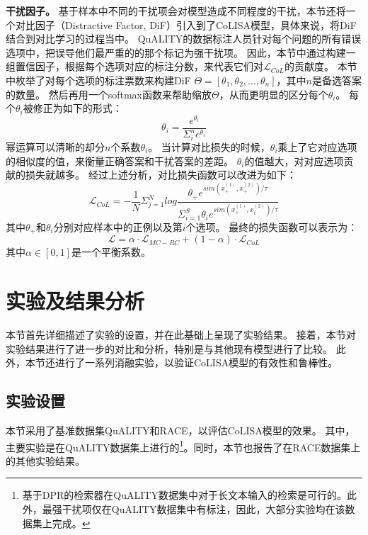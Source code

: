 \textbf{干扰因子。}
基于样本中不同的干扰项会对模型造成不同程度的干扰，本节还将一个对比因子（Distractive Factor, DiF）引入到了CoLISA模型，具体来说，将DiF结合到对比学习的过程当中。
QuALITY的数据标注人员针对每个问题的所有错误选项中，把误导他们最严重的的那个标记为强干扰项。
因此，本节中通过构建一组置信因子，根据每个选项对应的标注分数，来代表它们对$\mathcal L_{CoL}$的贡献度。
本节中枚举了对每个选项的标注票数来构建DiF $\Theta=[\theta_1, \theta_2, ..., \theta_n]$，其中$n$是备选答案的数量。
然后再用一个softmax函数来帮助缩放$\Theta$，从而更明显的区分每个$\theta_i$。
每个$\theta_i$被修正为如下的形式：
\begin{equation}
    \theta_i=\frac{e^{\theta_i}}{\Sigma^n_i e^{\theta_i}}
\end{equation}
幂运算可以清晰的却分$n$个系数$\theta_i$。
当计算对比损失的时候，$\theta_i$乘上了它对应选项的相似度的值，来衡量正确答案和干扰答案的差距。
$\theta_i$的值越大，对对应选项贡献的损失就越多。
经过上述分析，对比损失函数可以改进为如下：
\begin{equation}
    \mathcal L_{CoL}=-\frac{1}{N}\Sigma^N_{j=1}log \frac{\theta_+e^{sim(x^{(1)}_+,x^{(2)}_+)/ \tau}}{\Sigma^S_{i=1} \theta_ie^{sim(x^{(1)}_+,x^{(2)}_i)/ \tau}}
\end{equation}
其中$\theta_+$和$\theta_i$分别对应样本中的正例以及第$i$个选项。
最终的损失函数可以表示为：
\begin{equation}
    \mathcal L=\alpha \cdot \mathcal L_{MC-RC}+(1-\alpha) \cdot \mathcal L_{CoL}
\end{equation}
其中$\alpha \in[0,1]$是一个平衡系数。


\section{实验及结果分析}
本节首先详细描述了实验的设置，并在此基础上呈现了实验结果。
接着，本节对实验结果进行了进一步的对比和分析，特别是与其他现有模型进行了比较。
此外，本节还进行了一系列消融实验，以验证CoLISA模型的有效性和鲁棒性。

\subsection{实验设置}
本节采用了基准数据集QuALITY和RACE，以评估CoLISA模型的效果。
其中，主要实验是在QuALITY数据集上进行的\footnote{基于DPR的检索器在QuALITY数据集中对于长文本输入的检索是可行的。此外，最强干扰项仅在QuALITY数据集中有标注，因此，大部分实验均在该数据集上完成。}。同时，本节也报告了在RACE数据集上的其他实验结果。

